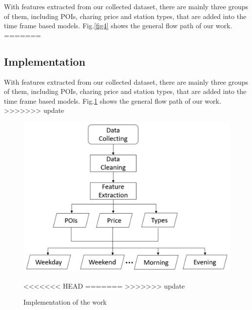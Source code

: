 With features extracted from our collected dataset, there are mainly three groups of them, including POIs, charing price and station types, that are added into the time frame based models. Fig.\ref{fig4} shows the general flow path of our work.
=======
\subsection{Implementation}

With features extracted from our collected dataset, there are mainly three groups of them, including POIs, charing price and station types, that are added into the time frame based models. Fig.\ref{fig8} shows the general flow path of our work.
>>>>>>> update

\begin{figure}[!htp]
	\centering
		\includegraphics[width=\columnwidth]{./figures/path.pdf}
	\caption{Implementation of the work}
<<<<<<< HEAD
	\label{fig4}
=======
	\label{fig8}
>>>>>>> update
\end{figure}
